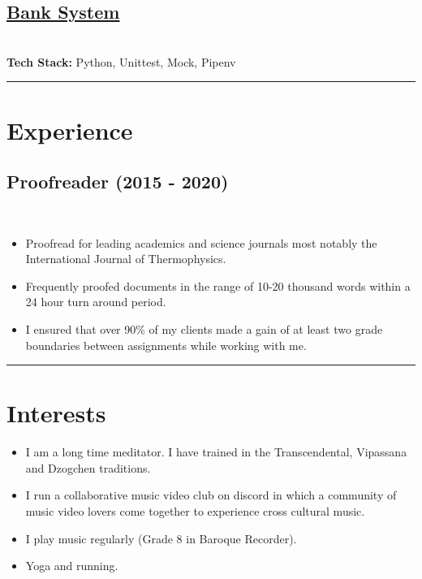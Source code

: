 \documentclass[12pt]{IEEEtran}
\newcommand{\cvrule}{\noindent\rule{8.5cm}{0.4pt}}
\begin{document}
\iffalse
\subsection*{\href{https://github.com/dpwdec/Makersbnb}{Maker's B'n'B}}
\noindent{A full stack clone of Air B'n'B.} \\[5pt]
\textbf{Tech Stack:} Ruby, Sinatra, Sinatra-Flash, Bcrypt, Pony, RSpec, Capybara
\fi

\subsection*{\href{https://github.com/dpwdec/bank-tech-test}{Bank System}}
 \\[5pt]
\textbf{Tech Stack:} Python, Unittest, Mock, Pipenv

\cvrule
\vskip 0.35in

\section*{\textbf{Experience}}

\subsection*{Proofreader (2015 - 2020)}
\\[1pt]
\begin{itemize}
\item Proofread for leading academics and science journals most notably the International Journal of Thermophysics.
\item Frequently proofed documents in the range of 10-20 thousand words within a 24 hour turn around period.
\item I ensured that over 90\% of my clients made a gain of at least two grade boundaries between assignments while working with me.
\end{itemize}

\cvrule
\vskip 0.35in
\section*{I\textbf{nterests}}

\begin{itemize}
\item I am a long time meditator. I have trained in the Transcendental, Vipassana and Dzogchen traditions.
\item I run a collaborative music video club on discord in which a community of music video lovers come together to experience cross cultural music.
\item I play music regularly (Grade 8 in Baroque Recorder).
\item Yoga and running.
\end{itemize}
\end{document}
